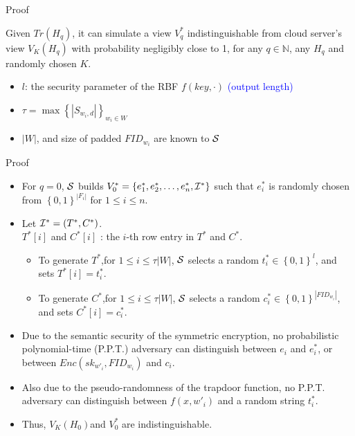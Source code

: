 \documentclass{beamer}
\begin{document}
\begin{frame}{Proof}
	\begin{definition}
		Given ${Tr({H_q})}$, it can simulate a view $V_q^*$ indistinguishable from cloud server's view ${V_K}({H_q})$ with probability negligibly close to 1, for any $q \in \mathbb{N}$, any ${H_q}$ and randomly chosen $K$.
	\end{definition}
	\begin{itemize}
		\item $l$: the security parameter of the RBF $f(key, \cdot )$ \textcolor{blue}{(output length)}
		\item  $\tau  = \max {\left\{ {\left| {{S_{{w_i},d}}} \right|} \right\}_{{w_i} \in W}}$
		\item $\left| W \right|$, and size of padded ${FI{D_{{w_i}}}}$ are known to $\cal S$	
	\end{itemize}
\end{frame}

\begin{frame}{Proof}
	\begin{itemize}
	\item For $q=0$, $\cal S$ builds $V_0^* = \left\{ {e_1^*,e_2^*, \ldots ,e_n^*,{{\cal I}^*}} \right\}$ such that $e_i^*$ is randomly chosen from ${\left\{ {0,1} \right\}^{\left| {{F_i}} \right|}}$ for $1 \le i \le n$.
	\item Let ${{\cal I}^*} = ({T^*},{C^*})$.\\
	${T^*}[i]$ and ${C^*}[i]$ : the $i$-th row entry in ${T^*}$ and ${C^*}$.
	\begin{itemize}
		\item To generate ${T^*}$,for $1 \le i \le \tau \left| W \right|$, $\cal S$ selects a random $t_i^* \in {\left\{ {0,1} \right\}^l}$, and sets ${T^*}[i] = t_i^*$.
		\item To generate ${C^*}$,for $1 \le i \le \tau \left| W \right|$, $\cal S$ selects a random $c_i^* \in {\left\{ {0,1} \right\}^{\left| {FI{D_{{w_i}}}} \right|}}$, and sets ${C^*}[i] = c_i^*$.
	\end{itemize}
	\item Due to the semantic security of the symmetric encryption, no probabilistic polynomial-time (P.P.T.) adversary can distinguish between ${e_i}$ and $e_i^*$, or between ${Enc(s{k_{w{'_i}}},FI{D_{{w_i}}})}$ and $c_i$.
	\item Also due to the pseudo-randomness of the trapdoor function, no P.P.T. adversary can distinguish between $f(x,w{'_i})$ and a random string $t_i^*$.
	\item Thus, ${V_K}({H_0})$and $V_0^*$ are indistinguishable.
\end{itemize}
\end{frame}
\end{document}

